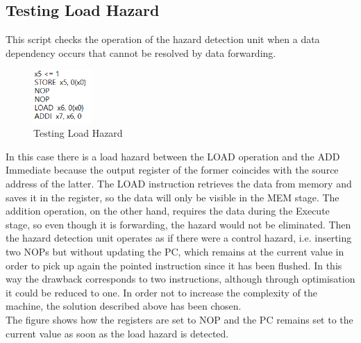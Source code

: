 \subsection{Testing Load Hazard}
This script checks the operation of the hazard detection unit when a data dependency occurs that cannot be resolved by data forwarding.
\begin{figure}[H]
	\centering
	\includegraphics[width=0.2\textwidth]{sec3/images/test7.png}
	\caption{Testing Load Hazard}
	\label{fig:test7}
\end{figure}
\noindent In this case there is a load hazard between the LOAD operation and the ADD Immediate because the output register of the former coincides with the source address of the latter. The LOAD instruction retrieves the data from memory and saves it in the register, so the data will only be visible in the MEM stage. The addition operation, on the other hand, requires the data during the Execute stage, so even though it is forwarding, the hazard would not be eliminated. Then the hazard detection unit operates as if there were a control hazard, i.e. inserting two NOPs but without updating the PC, which remains at the current value in order to pick up again the pointed instruction since it has been flushed. In this way the drawback corresponds to two instructions, although through optimisation it could be reduced to one. In order not to increase the complexity of the machine, the solution described above has been chosen.\\
The figure shows how the registers are set to NOP and the PC remains set to the current value as soon as the load hazard is detected.

